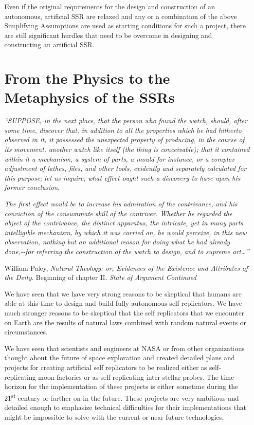 Even if the original requirements for the design and construction of an
autonomous, artificial SSR are relaxed and any or a combination of the
above Simplifying Assumptions are used as starting conditions for such
a project, there are still significant hurdles that need to be overcome
in designing and constructing an artificial SSR.

\section{From the Physics to the Metaphysics of the SSRs}

\textit{“SUPPOSE, in the next place, that the person who found the
watch, should, after some time, discover that, in addition to all the
properties which he had hitherto observed in it, it possessed the
unexpected property of producing, in the course of its movement,
another watch like itself (the thing is conceivable); that it contained
within it a mechanism, a system of parts, a mould for instance, or a
complex adjustment of lathes, files, and other tools, evidently and
separately calculated for this purpose; let us inquire, what effect
ought such a discovery to have upon his former conclusion.}

\textit{The first effect would be to increase his admiration of the
contrivance, and his conviction of the consummate skill of the
contriver. Whether he regarded the object of the contrivance, the
distinct apparatus, the intricate, yet in many parts intelligible
mechanism, by which it was carried on, he would perceive, in this new
observation, nothing but an additional reason for doing what he had
already done,-{}-for referring the construction of the watch to design,
and to supreme art…”}

William Paley, \textit{Natural Theology: or, Evidences of the Existence
and Attributes of the Deity}. Beginning of chapter II. \textit{State of
Argument Continued}

We have seen that we have very strong reasons to be skeptical that
humans are able at this time to design and build fully autonomous
self-replicators. We have much stronger reasons to be skeptical that
the self replicators that we encounter on Earth are the results of
natural laws combined with random natural events or circumstances.

We have seen that scientists and engineers at NASA or from other
organizations thought about the future of space exploration and created
detailed plans and projects for creating artificial self replicators to
be realized either as self-replicating moon factories or as
self-replicating inter-stellar probes.  The time horizon for the
implementation of these projects is either sometime during the
21\textsuperscript{st} century or farther on in the future. These
projects are very ambitious and detailed enough to emphasize technical
difficulties for their implementations that might be impossible to
solve with the current or near future technologies.

